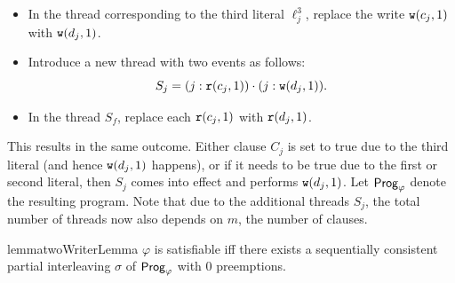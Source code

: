 \begin{itemize}[left=0.5em]
\item In the thread corresponding to the third literal $\ell_j^3$, replace the write $\mathtt{w}(c_j,1)$ with $\mathtt{w}(d_j,1)$.
\item Introduce a new thread with two events as follows:
\[
S_j = (j : \mathtt{r}(c_j,1)) \cdot (j : \mathtt{w}(d_j,1)).
\]
\item In the thread $S_f$, replace each $\mathtt{r}(c_j,1)$ with $\mathtt{r}(d_j,1)$.
\end{itemize}

This results in the same outcome. Either clause $C_j$ is set to true due to the third literal (and hence $\mathtt{w}(d_j, 1)$ happens), or if it needs to be true due to the first or second literal, then $S_j$ comes into effect and performs $\mathtt{w}(d_j, 1)$.
Let $\mathsf{Prog}_\varphi$ denote the resulting program. Note that due to the additional threads $S_j$, the total number of threads now also depends on $m$, the number of clauses. 


\begin{restatable}{lemma}{twoWriterLemma}\label{lem:np-two-writer}
$\varphi$ is satisfiable iff there exists a sequentially consistent partial interleaving $\sigma$ of $\mathsf{Prog}_\varphi$ with $0$ preemptions.
\end{restatable}

